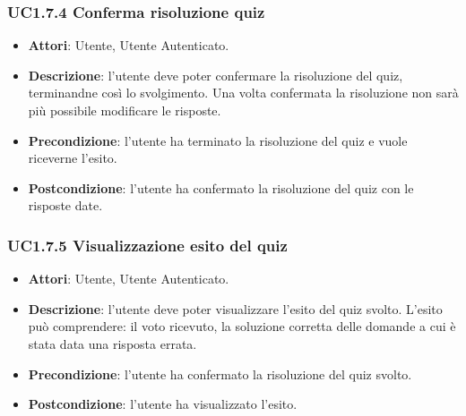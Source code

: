 \subsubsection{UC1.7.4 Conferma risoluzione quiz}
\begin{itemize}
\item \textbf{Attori}: Utente, Utente Autenticato.
\item \textbf{Descrizione}: l'utente deve poter confermare la risoluzione del quiz, terminandne così lo svolgimento. Una volta confermata la risoluzione non sarà più possibile modificare le risposte.
\item \textbf{Precondizione}:  l'utente ha terminato la risoluzione del quiz e vuole riceverne l'esito.
\item \textbf{Postcondizione}: l'utente ha confermato la risoluzione del quiz con le risposte date.
\end{itemize}
\subsubsection{UC1.7.5 Visualizzazione esito del quiz}
\begin{itemize}
\item \textbf{Attori}: Utente, Utente Autenticato.
\item \textbf{Descrizione}: l'utente deve poter visualizzare l'esito del quiz svolto. L'esito può comprendere: il voto ricevuto, la soluzione corretta delle domande a cui è stata data una risposta errata.
\item \textbf{Precondizione}: l'utente ha confermato la risoluzione del quiz svolto.
\item \textbf{Postcondizione}: l'utente ha visualizzato l'esito.
\end{itemize}
